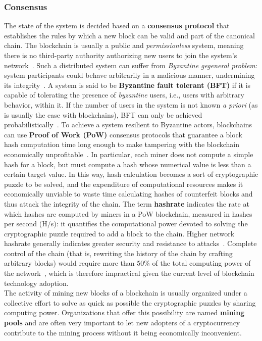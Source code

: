 \documentclass[conference]{IEEEtran}
\begin{document}
\subsubsection{Consensus}
The state of the system is decided based on a \textbf{consensus protocol} that establishes the rules by which a new block can be valid and part of the canonical chain. The blockchain is usually a public and \textit{permissionless} system, meaning there is no third-party authority authorizing new users to join the system's network~\cite{permissionless_blockchains}. Such a distributed system can suffer from \textit{Byzantine gegeneral problem}: system participants could behave arbitrarily in a malicious manner, undermining its integrity~\cite{byzantine_systems}. A system is said to be \textbf{Byzantine fault tolerant (BFT)} if it is capable of tolerating the presence of \textit{byzantine} users, i.e., users with arbitrary behavior, within it. If the number of users in the system is not known \textit{a priori} (as is usually the case with blockchains), BFT can only be achieved probabilistically~\cite{permissionless_bft}. To achieve a system resilient to Byzantine actors, blockchains can use \textbf{Proof of Work (PoW)} consensus protocols that guarantee a block hash computation time long enough to make tampering with the blockchain economically unprofitable~\cite{pow_for_bft}. In particular, each miner does not compute a simple hash for a block, but must compute a hash whose numerical value is less than a certain target value. In this way, hash calculation becomes a sort of cryptographic puzzle to be solved, and the expenditure of computational resources makes it economically unviable to waste time calculating hashes of counterfeit blocks and thus attack the integrity of the chain. The term \textbf{hashrate} indicates the rate at which hashes are computed by miners in a PoW blockchain, measured in hashes per second (H/s): it quantifies the computational power devoted to solving the cryptographic puzzle required to add a block to the chain. Higher network hashrate generally indicates greater security and resistance to attacks~\cite{hashrate}. Complete control of the chain (that is, rewriting the history of the chain by crafting arbitrary blocks) would require more than 50\% of the total computing power of the network~\cite{attack_51}, which is therefore impractical given the current level of blockchain technology adoption.\\
The activity of mining new blocks of a blockchain is usually organized under a collective effort to solve as quick as possible the cryptographic puzzles by sharing computing power. Organizations that offer this possibility are named \textbf{mining pools} and are often very important to let new adopters of a cryptocurrency contribute to the mining process without it being economically inconvenient.~\cite{mining_pools}
\end{document}
